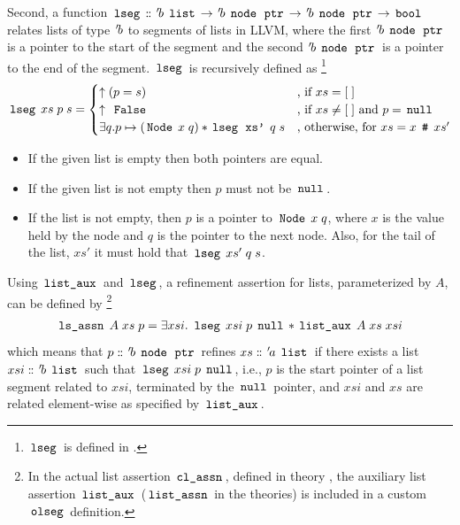 Second, a function $\,\text{\ttfamily lseg}\, \mathrel{\mathord{:}\mkern-1.2mu\mathord{:}} {\mskip2mu '\mskip-2mub} \; \,\text{\ttfamily list}\, \rightarrow {\mskip2mu '\mskip-2mub} \; \,\text{\ttfamily node}\, \; \,\text{\ttfamily ptr}\, \rightarrow {\mskip2mu '\mskip-2mub} \; \,\text{\ttfamily node}\, \; \,\text{\ttfamily ptr}\, \rightarrow \,\text{\ttfamily bool}\,$ relates lists of type ${\mskip2mu '\mskip-2mub}$ to segments of lists in LLVM, where the first ${\mskip2mu '\mskip-2mub} \; \,\text{\ttfamily node}\, \; \,\text{\ttfamily ptr}\,$ is a pointer to the start of the segment and the second ${\mskip2mu '\mskip-2mub} \; \,\text{\ttfamily node}\, \; \,\text{\ttfamily ptr}\,$ is a pointer to the end of the segment.
$\,\text{\ttfamily lseg}\,$ is recursively defined as
\footnote{$\,\text{\ttfamily lseg}\,$ is defined in .}
\begin{align*}
	\,\text{\ttfamily lseg}\, \; xs \; p \; s =
	\begin{cases}
		\uparrow(p = s)                                                                                & \text{, if $xs = [ \; ]$}                        \\
		\uparrow \; \,\text{\ttfamily False}\,                                                                     & \text{, if $xs \neq [ \; ]$ and $p=\,\text{\ttfamily null}\,$} \\
		\exists q. p \mapsto (\,\text{\ttfamily Node}\, \; x \; q) \ast \,\text{\ttfamily lseg}\, \; \,\text{\ttfamily xs'}\, \; q \; s & \text{, otherwise, for $xs = x \; \,\text{\ttfamily \#}\, \; xs'$}
	\end{cases}
\end{align*}
\begin{itemize}
	\item If the given list is empty then both pointers are equal.
	\item If the given list is not empty then $p$ must not be $\,\text{\ttfamily null}\,$.
	\item If the list is not empty, then $p$ is a pointer to $\,\text{\ttfamily Node}\, \; x \; q$, where $x$ is the value held by the node and $q$ is the pointer to the next node.
	      Also, for the tail of the list, $xs'$ it must hold that $\,\text{\ttfamily lseg}\, \; xs' \; q \; s$.
\end{itemize}

Using $\,\text{\ttfamily list\_aux}\,$ and $\,\text{\ttfamily lseg}\,$, a refinement assertion for lists, parameterized by $A$, can be defined by
\footnote{In the actual list assertion $\,\text{\ttfamily cl\_assn}\,$, defined in theory , the auxiliary list assertion $\,\text{\ttfamily list\_aux}\,$ ($\,\text{\ttfamily list\_assn}\,$ in the theories) is included in a custom $\,\text{\ttfamily olseg}\,$ definition.}
\begin{align*}
	\,\text{\ttfamily ls\_assn}\, \; A \; xs \; p = \exists xsi.\ \,\text{\ttfamily lseg}\, \; xsi \; p \; \,\text{\ttfamily null}\, \ast \,\text{\ttfamily list\_aux}\, \; A \; xs \; xsi
\end{align*}
which means that $p \mathrel{\mathord{:}\mkern-1.2mu\mathord{:}} {\mskip2mu '\mskip-2mub} \; \,\text{\ttfamily node}\, \; \,\text{\ttfamily ptr}\,$ refines $xs \mathrel{\mathord{:}\mkern-1.2mu\mathord{:}} {\mskip2mu '\mskip-2mua} \; \,\text{\ttfamily list}\,$ if there exists a list $xsi \mathrel{\mathord{:}\mkern-1.2mu\mathord{:}} {\mskip2mu '\mskip-2mub} \; \,\text{\ttfamily list}\,$ such that $\,\text{\ttfamily lseg}\, \; xsi \; p \; \,\text{\ttfamily null}\,$, i.e., $p$ is the start pointer of a list segment related to $xsi$, terminated by the $\,\text{\ttfamily null}\,$ pointer, and $xsi$ and $xs$ are related element-wise as specified by $\,\text{\ttfamily list\_aux}\,$.

